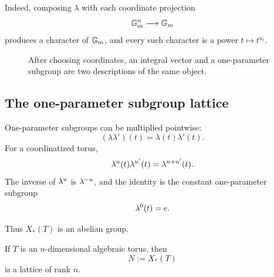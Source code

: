 Indeed, composing \(\lambda\) with each coordinate projection
\[
\mathbb{G}_{m}^n\longrightarrow\mathbb{G}_{m}
\]
produces a character of \(\mathbb{G}_{m}\), and every such character is a power
\(t\mapsto t^{u_i}\).

\begin{figure}[ht]
\centering
{}
\caption{After choosing coordinates, an integral vector and a
one-parameter subgroup are two descriptions of the same object.}
\label{fig:vector-monomial-one-parameter-subgroup}
\end{figure}

\subsection{The one-parameter subgroup lattice}

One-parameter subgroups can be multiplied pointwise:
\[
(\lambda\lambda')(t)
=
\lambda(t)\lambda'(t).
\]
For a coordinatized torus,
\[
\lambda^{u}(t)\lambda^{u'}(t)
=
\lambda^{u+u'}(t).
\]
The inverse of \(\lambda^{u}\) is \(\lambda^{-u}\), and the identity is the
constant one-parameter subgroup
\[
\lambda^{0}(t)=e.
\]

Thus \(X_*(T)\) is an abelian group.

\begin{theorem}
If \(T\) is an \(n\)-dimensional algebraic torus, then
\[
N:=X_*(T)
\]
is a lattice of rank \(n\).
\end{theorem}

